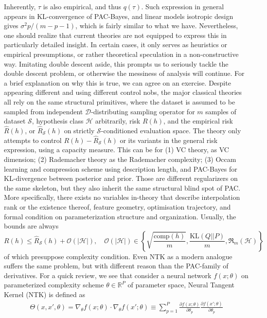 Inherently, $\tau$ is also empirical, and thus $q(\tau)$. Such expression in general appears in KL-convergence of PAC-Bayes, and linear models isotropic design gives $\sigma^{2}p/(m-p-1)$, which is fairly similar to what we have. Nevertheless, one should realize that current theories are not equipped to express this in particularly detailed insight. In certain cases, it only serves as heuristics or empirical presumptions, or rather theoretical speculation in a non-constructive way. Imitating double descent aside, this prompts us to seriously tackle the double descent problem, or otherwise the messiness of analysis will continue. For a brief explanation on why this is true, we can agree on an exercise. Despite appearing different and using different control nobs, the major classical theories all rely on the same structural primitives, where the dataset is assumed to be sampled from independent $\mathcal{D}$-distributing sampling operator for $m$ samples of dataset $\mathcal{S}$, hypothesis class $\mathcal{H}$ arbitrarily, risk $R(h)$, and the empirical risk $\hat{R}(h)$, or $\hat{R}_{\mathcal{S}}(h)$ on strictly $\mathcal{S}$-conditioned evaluation space. The theory only attempts to control $R(h)-\hat{R}_{\mathcal{S}}(h)$ or its variants in the general risk expression, using a capacity measure. This can be for (1) VC theory, as VC dimension; (2) Rademacher theory as the Rademacher complexity; (3) Occam learning and compression scheme using description length, and PAC-Bayes for KL-divergence between posterior and prior. Those are different regularizers on the same skeleton, but they also inherit the same structural blind spot of PAC. More specifically, there exists no variables in-theory that describe interpolation rank or the existence thereof, feature geometry, optimisation trajectory, and formal condition on parameterization structure and organization. Usually, the bounds are always
\begin{equation}
    R(h) \leq \hat{R}_{\mathcal{S}}(h) + \mathcal{O}(|\mathcal{H}|), \quad \mathcal{O}(|\mathcal{H}|) \in \left\{\sqrt{\frac{\mathrm{comp}(h)}{m}}, \frac{\mathrm{KL}(Q||P)}{m}, \mathfrak{R}_{m}(\mathcal{H})\right\}
\end{equation}
of which presuppose complexity condition. Even NTK as a modern analogue suffers the same problem, but with different reason than the PAC-family of derivatives. For a quick review, we see that consider a neural network $f(x;\theta)$ on parameterized complexity scheme $\theta\in\mathbb{R}^{P}$ of parameter space, Neural Tangent Kernel (NTK) is defined as
\begin{equation}
    \begin{split}
        \Theta(x,x',\theta) = \nabla_{\theta}f(x;\theta) \cdot \nabla_{\theta}f(x';\theta) 
         \equiv \sum^{P}_{p=1} \frac{\partial f(x;\theta)}{\partial \theta_{p}} \frac{\partial f(x';\theta)}{\partial \theta_{p}}
    \end{split}
\end{equation}
